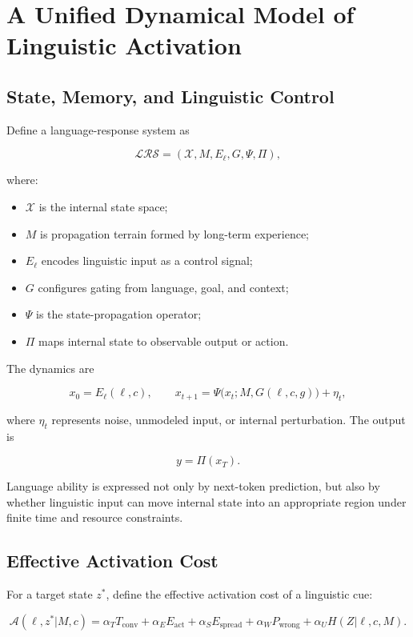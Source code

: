 \documentclass[11pt, a4paper]{article}
\begin{document}
\section{A Unified Dynamical Model of Linguistic Activation}


\subsection{State, Memory, and Linguistic Control}


Define a language-response system as


\[
\mathcal{LRS}=(\mathcal{X},M,E_\ell,G,\Psi,\Pi),
\]

where:


\begin{itemize}
\item $\mathcal{X}$ is the internal state space;
\item $M$ is propagation terrain formed by long-term experience;
\item $E_\ell$ encodes linguistic input as a control signal;
\item $G$ configures gating from language, goal, and context;
\item $\Psi$ is the state-propagation operator;
\item $\Pi$ maps internal state to observable output or action.
\end{itemize}


The dynamics are


\[
x_0=E_\ell(\ell,c),
\qquad
x_{t+1}
=
\Psi\big(x_t;M,G(\ell,c,g)\big)+\eta_t,
\tag{5}
\]

where $\eta_t$ represents noise, unmodeled input, or internal perturbation. The output is


\[
y=\Pi(x_T).
\tag{6}
\]

Language ability is expressed not only by next-token prediction, but also by whether linguistic input can move internal state into an appropriate region under finite time and resource constraints.


\subsection{Effective Activation Cost}


For a target state $z^*$, define the effective activation cost of a linguistic cue:


\[
\mathcal{A}(\ell,z^*|M,c)
=
\alpha_T T_{\text{conv}}
+\alpha_E E_{\text{act}}
+\alpha_S E_{\text{spread}}
+\alpha_W P_{\text{wrong}}
+\alpha_U H(Z|\ell,c,M).
\tag{7}
\]
\end{document}
